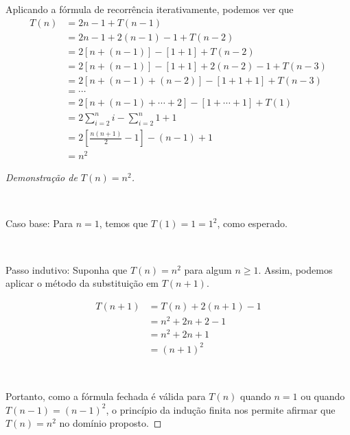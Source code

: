 Aplicando a fórmula de recorrência iterativamente, podemos ver que
\begin{align*}
    T(n) &= 2n - 1 + T(n - 1) \\
    &= 2n - 1 + 2 (n - 1) - 1 + T(n - 2) \\
    &= 2 \left[n + (n - 1)\right] - \left[1 + 1\right] + T(n - 2) \\
    &= 2 \left[n + (n - 1)\right] - \left[1 + 1\right] + 2 (n - 2) - 1 + T(n - 3) \\
    &= 2 \left[n + (n - 1) + (n - 2)\right] - \left[1 + 1 + 1\right] + T(n - 3) \\
    &= \cdots \\
    &= 2 \left[n + (n - 1) + \cdots + 2\right] - \left[1 + \cdots + 1\right] + T(1) \\
    &= 2 \sum_{i = 2}^n i - \sum_{i = 2}^n 1 + 1 \\
    &= 2 \left[\frac{n (n + 1)}{2} - 1\right] - (n - 1) + 1 \\
    &= n^2
\end{align*}

\itemsep

\begin{proof}[Demonstração de $T(n) = n^2$]~

    ~

    Caso base: Para $n = 1$, temos que $T(1) = 1 = 1^2$, como esperado.

    ~

    Passo indutivo: Suponha que $T(n) = n^2$ para algum $n \geq 1$. Assim, podemos aplicar o método da substituição em $T(n+1)$.

    \begin{align*}
        T(n + 1) &= T(n) + 2(n + 1) - 1 \\
        &= n^2 + 2n + 2 - 1 \\
        &= n^2  + 2n + 1 \\
        &= (n + 1)^2
    \end{align*}

    ~

    Portanto, como a fórmula fechada é válida para $T(n)$ quando $n = 1$ ou quando $T(n-1) = (n - 1)^2$, o princípio da indução finita nos permite afirmar que $T(n) = n^2$ no domínio proposto.
\end{proof}
